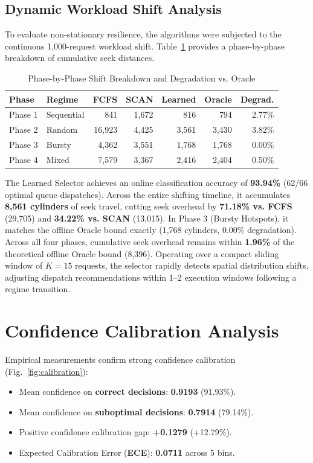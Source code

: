 \documentclass[conference,10pt]{IEEEtran}
\begin{document}
\subsection{Dynamic Workload Shift Analysis}
To evaluate non-stationary resilience, the algorithms were subjected to the continuous 1,000-request workload shift. Table~\ref{tab:phase_shift} provides a phase-by-phase breakdown of cumulative seek distances.

\begin{table}[t]
\centering
\footnotesize
\setlength{\tabcolsep}{2.0pt}
\caption{Phase-by-Phase Shift Breakdown and Degradation vs. Oracle}
\label{tab:phase_shift}
\begin{tabular*}{\columnwidth}{@{\extracolsep{\fill}}llrrrrr}
\toprule
\textbf{Phase} & \textbf{Regime} & \textbf{FCFS} & \textbf{SCAN} & \textbf{Learned} & \textbf{Oracle} & \textbf{Degrad.} \\
\midrule
Phase 1 & Sequential & 841 & 1,672 & 816 & 794 & 2.77\% \\
Phase 2 & Random & 16,923 & 4,425 & 3,561 & 3,430 & 3.82\% \\
Phase 3 & Bursty & 4,362 & 3,551 & 1,768 & 1,768 & 0.00\% \\
Phase 4 & Mixed & 7,579 & 3,367 & 2,416 & 2,404 & 0.50\% \\
\bottomrule
\end{tabular*}
\end{table}

The Learned Selector achieves an online classification accuracy of \textbf{93.94\%} (62/66 optimal queue dispatches). Across the entire shifting timeline, it accumulates \textbf{8,561 cylinders} of seek travel, cutting seek overhead by \textbf{71.18\% vs. FCFS} (29,705) and \textbf{34.22\% vs. SCAN} (13,015). In Phase 3 (Bursty Hotspots), it matches the offline Oracle bound exactly (1,768 cylinders, $0.00\%$ degradation). Across all four phases, cumulative seek overhead remains within \textbf{1.96\%} of the theoretical offline Oracle bound (8,396). Operating over a compact sliding window of $K = 15$ requests, the selector rapidly detects spatial distribution shifts, adjusting dispatch recommendations within 1--2 execution windows following a regime transition.

\clearpage

\section{Confidence Calibration Analysis}
Empirical measurements confirm strong confidence calibration (Fig.~\ref{fig:calibration}):
\begin{itemize}
    \item Mean confidence on \textbf{correct decisions}: \textbf{0.9193} (91.93\%).
    \item Mean confidence on \textbf{suboptimal decisions}: \textbf{0.7914} (79.14\%).
    \item Positive confidence calibration gap: \textbf{+0.1279} (+12.79\%).
    \item Expected Calibration Error (\textbf{ECE}): \textbf{0.0711} across 5 bins.
\end{itemize}
\end{document}
